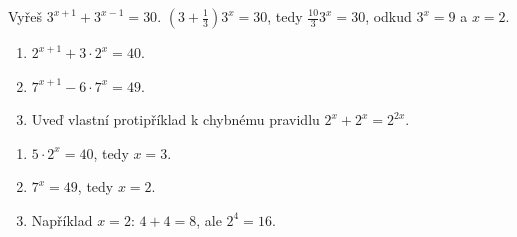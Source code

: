 \documentclass[11pt,a4paper]{article}
\begin{document}
\begin{zadaniReseniBox}[title={Rozšíření 1}]
Vyřeš $3^{x+1}+3^{x-1}=30$.
\tcblower
$(3+\tfrac13)3^x=30$, tedy $\frac{10}{3}3^x=30$, odkud $3^x=9$ a $x=2$.
\end{zadaniReseniBox}
\begin{zadaniReseniBox}[title={Domácí úkol}]
\begin{enumerate}[label=\alph*)]
\item $2^{x+1}+3\cdot2^x=40$.
\item $7^{x+1}-6\cdot7^x=49$.
\item Uveď vlastní protipříklad k chybnému pravidlu $2^x+2^x=2^{2x}$.
\end{enumerate}
\tcblower
\begin{enumerate}[label=\alph*)]
\item $5\cdot2^x=40$, tedy $x=3$.
\item $7^x=49$, tedy $x=2$.
\item Například $x=2$: $4+4=8$, ale $2^4=16$.
\end{enumerate}
\end{zadaniReseniBox}
\end{document}
